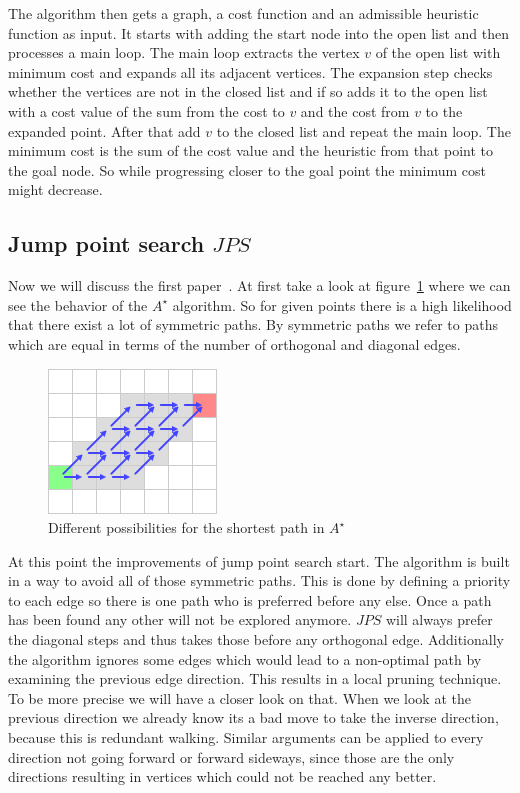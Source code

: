 \documentclass{article}
\begin{document}
    The algorithm then gets a graph, a cost function and an admissible heuristic function as input. It starts with adding the start node into the open list and then processes a main loop. The main loop extracts the vertex $v$ of the open list with minimum cost and expands all its adjacent vertices. The expansion step checks whether the vertices are not in the closed list and if so adds it to the open list with a cost value of the sum from the cost to $v$ and the cost from $v$ to the expanded point. After that add $v$ to the closed list and repeat the main loop. The minimum cost is the sum of the cost value and the heuristic from that point to the goal node. So while progressing closer to the goal point the minimum cost might decrease.

    \subsection{Jump point search $JPS$}

    Now we will discuss the first paper~\cite{DBLP:conf/aaai/HaraborG11}. At first take a look at figure~\ref{fig:symmetricpath} where we can see the behavior of the $A^\star$ algorithm. So for given points there is a high likelihood that there exist a lot of symmetric paths. By symmetric paths we refer to paths which are equal in terms of the number of orthogonal and diagonal edges.

    \begin{figure}[!htb]
        \centering
        \includegraphics{figures/symmetricpath.png}
        \caption{Different possibilities for the shortest path in $A^\star$ \cite{JPSexplained}}
        \label{fig:symmetricpath}
    \end{figure}

    At this point the improvements of jump point search start. The algorithm is built in a way to avoid all of those symmetric paths. This is done by defining a priority to each edge so there is one path who is preferred before any else. Once a path has been found any other will not be explored anymore. $JPS$ will always prefer the diagonal steps and thus takes those before any orthogonal edge. Additionally the algorithm ignores some edges which would lead to a non-optimal path by examining the previous edge direction. This results in a local pruning technique. To be more precise we will have a closer look on that. When we look at the previous direction we already know its a bad move to take the inverse direction, because this is redundant walking. Similar arguments can be applied to every direction not going forward or forward sideways, since those are the only directions resulting in vertices which could not be reached any better.
\end{document}
